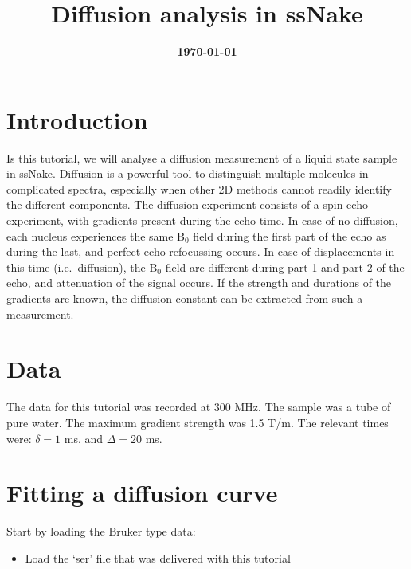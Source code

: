 \documentclass[11pt,a4paper]{article}
\title{\color{black}\fontfamily{SourceSansPro-LF}\bfseries Diffusion analysis in ssNake}
\author{}
\date{\color{black}\fontfamily{SourceSansPro-LF}\bfseries \today}
\begin{document}

\maketitle

\section{Introduction}
Is this tutorial, we will analyse a diffusion measurement of a liquid state sample in ssNake.
Diffusion is a powerful tool to distinguish multiple molecules in complicated spectra, especially when
other 2D methods cannot readily identify the different components. The diffusion experiment consists
of a spin-echo experiment, with gradients present during the echo time. In case of no diffusion,
each nucleus experiences the same B$_0$ field during the first part of the echo as during the last,
and perfect echo refocussing occurs. In case of displacements in this time (i.e.\ diffusion), the
B$_0$ field are different during part 1 and part 2 of the echo, and attenuation of the signal occurs.
If the strength and durations of the gradients are known, the diffusion constant can be extracted
from such a measurement.


\section{Data}
The data for this tutorial was recorded at 300 MHz.
The sample was a tube of pure water.
The maximum gradient strength was 1.5 T/m. The relevant times were: $\delta = 1$ ms, and $\Delta = 20$ ms.

\section{Fitting a diffusion curve}
Start by loading the Bruker type data:
\begin{itemize}
  \item Load the `ser' file that was delivered with this tutorial
\end{itemize}
\end{document}

